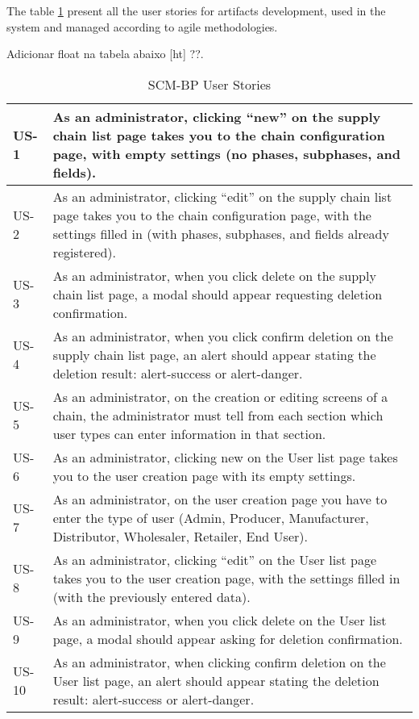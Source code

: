 
The table \ref{table:userStories} present all the user stories for artifacts development, used in the system and managed according to agile methodologies.

{\color{red} Adicionar float na tabela abaixo [ht] ??.}
\begin{table}[htpb]
\caption{\ac{SCM-BP} User Stories}
\label{table:userStories}
    \begin{tabular}{|l|p{13.5cm}|}
    \hline 
    US-1  & As an administrator, clicking “new” on the supply chain list page takes you to the chain configuration page, with empty settings (no phases, subphases, and fields).\\
    \hline 
    US-2  & As an administrator, clicking “edit” on the supply chain list page takes you to the chain configuration page, with the settings filled in (with phases, subphases, and fields already registered). \\
    \hline
    US-3  & As an administrator, when you click delete on the supply chain list page, a modal should appear requesting deletion confirmation.\\
    \hline
    US-4  & As an administrator, when you click confirm deletion on the supply chain list page, an alert should appear stating the deletion result: alert-success or alert-danger.\\
    \hline
    US-5  & As an administrator, on the creation or editing screens of a chain, the administrator must tell from each section which user types can enter information in that section.\\
    \hline
    US-6  & As an administrator, clicking new on the User list page takes you to the user creation page with its empty settings.\\
    \hline
    US-7  & As an administrator, on the user creation page you have to enter the type of user (Admin, Producer, Manufacturer, Distributor, Wholesaler, Retailer, End User).\\
    \hline
    US-8  & As an administrator, clicking “edit” on the User list page takes you to the user creation page, with the settings filled in (with the previously entered data).\\
    \hline
    US-9  & As an administrator, when you click delete on the User list page, a modal should appear asking for deletion confirmation.\\
    \hline
    US-10 & As an administrator, when clicking confirm deletion on the User list page, an alert should appear stating the deletion result: alert-success or alert-danger.\\

\end{tabular}
\end{table}
